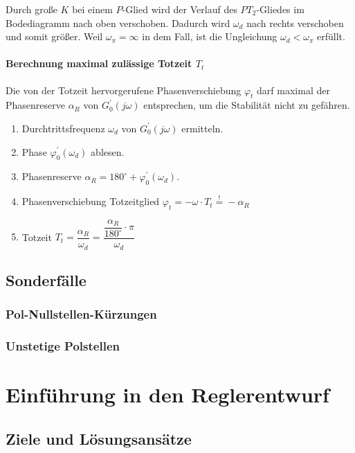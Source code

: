 \documentclass[12pt]{article}
\begin{document}
Durch große \(K\) bei einem \(P\)-Glied wird der Verlauf des \(PT_2\)-Gliedes im Bodediagramm nach oben verschoben. Dadurch wird \(\omega_d\) nach rechts verschoben und somit größer. Weil \(\omega_{\pi} = \infty\) in dem Fall, ist die Ungleichung \(\omega_d < \omega_{\pi}\) erfüllt.

\paragraph{Berechnung maximal zulässige Totzeit \(T_t\)}\par
Die von der Totzeit hervorgerufene Phasenverschiebung \(\varphi_t\) darf maximal der Phasenreserve \(\alpha_R\) von \(G^{'}_{0} (j \omega)\) entsprechen, um die Stabilität nicht zu gefähren.
\begin{enumerate}[label=\arabic*.]
	\item Durchtrittsfrequenz \(\omega_d\) von \(G^{'}_{0} (j \omega)\) ermitteln.
	\item Phase \(\varphi^{'}_{0} (\omega_d)\) ablesen.
	\item Phasenreserve \(\alpha_R = 180^\circ + \varphi^{'}_{0} (\omega_d)\).
	\item Phasenverschiebung Totzeitglied \(\varphi_t = -\omega \cdot T_t \overset{!}{=} -\alpha_R\)
	\item Totzeit \(T_t = \dfrac{\alpha_R}{\omega_d} = \dfrac{\dfrac{\alpha_R}{180^\circ}\cdot \pi}{\omega_d}\)
\end{enumerate}


\subsection{Sonderfälle}
\subsubsection{Pol-Nullstellen-Kürzungen}
\subsubsection{Unstetige Polstellen}

\clearpage
\section{Einführung in den Reglerentwurf}
\subsection{Ziele und Lösungsansätze}
\end{document}
